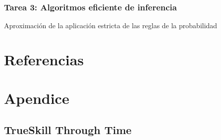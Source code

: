 \documentclass[a4paper,11pt]{book}
\theoremstyle{definition}
\newif\ifen
\newif\ifes
\newcommand{\en}[1]{\ifen#1\fi}
\newcommand{\es}[1]{\ifes#1\fi}
\begin{document}
\subsection{Tarea 3: Algoritmos eficiente de inferencia}

Aproximaci\'on de la aplicaci\'on estricta de las reglas de la probabilidad



\chapter{Referencias}




\chapter{Apendice} \label{app:technical}



\section{TrueSkill Through Time}

\subsection{\en{Skill evolution}}\label{sec:appendix_skill_evolution}
\end{document}
